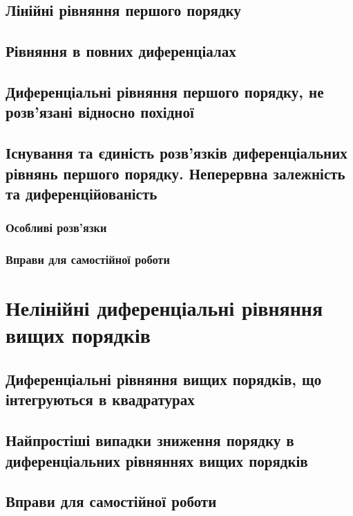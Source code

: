 \documentclass[a4paper, 12pt]{article}
\theoremstyle{definition}
\numberwithin{equation}{section}%
\numberwithin{equation}{subsection}
\begin{document}


\subsection{Лінійні рівняння першого порядку}



\subsection{Рівняння в повних диференціалах}



\subsection{Диференціальні рівняння першого порядку, не розв’язані відносно похідної}



\subsection{Існування та єдиність розв’язків диференціальних рівнянь першого порядку. Неперервна залежність та диференційованість}



\subsubsection{Особливі розв’язки}



\subsubsection{Вправи для самостійної роботи}



\section{Нелінійні диференціальні рівняння вищих порядків}



\subsection{Диференціальні рівняння вищих порядків, що інтегруються в квадратурах}



\subsection{Найпростіші випадки зниження порядку в диференціальних рівняннях вищих порядків}



\subsection{Вправи для самостійної роботи}


\end{document}
